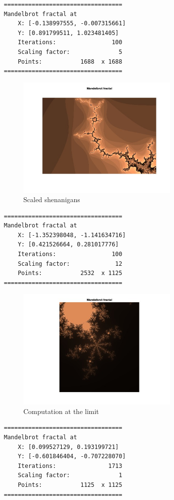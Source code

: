 \begin{verbatim}
==================================
Mandelbrot fractal at
    X: [-0.138997555, -0.007315661]
    Y: [0.891799511, 1.023481405]
    Iterations:                100
    Scaling factor:              5
    Points:           1688  x 1688
==================================
\end{verbatim}

\begin{figure}[H]
    \centering
    \includegraphics[width=8cm]{figures/scaled}
    \caption{Scaled shenanigans}
\end{figure}

\begin{verbatim}
==================================
Mandelbrot fractal at
    X: [-1.352398048, -1.141634716]
    Y: [0.421526664, 0.281017776]
    Iterations:                100
    Scaling factor:             12
    Points:           2532  x 1125
==================================
\end{verbatim}


\begin{figure}[H]
    \centering
    \includegraphics[width=8cm]{figures/max}
    \caption{Computation at the limit}
\end{figure}

\begin{verbatim}
==================================
Mandelbrot fractal at
    X: [0.099527129, 0.193199721]
    Y: [-0.601846404, -0.707228070]
    Iterations:               1713
    Scaling factor:              1
    Points:           1125  x 1125
==================================
\end{verbatim}


